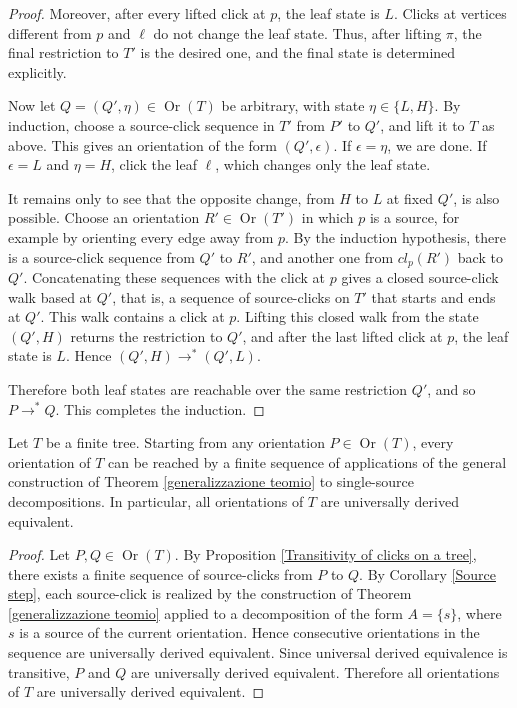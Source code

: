 \begin{proof}
Moreover, after every lifted click at $p$, the leaf state is $L$. Clicks at vertices different from $p$ and $\ell$ do not change the leaf state. Thus, after lifting $\pi$, the final restriction to $T'$ is the desired one, and the final state is determined explicitly.

Now let $Q=(Q',\eta) \in \operatorname{Or}(T)$ be arbitrary, with state $\eta \in \{L,H\}$. By induction, choose a source-click sequence in $T'$ from $P'$ to $Q'$, and lift it to $T$ as above. This gives an orientation of the form $(Q', \epsilon)$. If $\epsilon = \eta$, we are done. If $\epsilon=L$ and $\eta=H$, click the leaf $\ell$, which changes only the leaf state.

It remains only to see that the opposite change, from $H$ to $L$ at fixed $Q'$, is also possible. Choose an orientation $R' \in \operatorname{Or}(T')$ in which $p$ is a source, for example by orienting every edge away from $p$. By the induction hypothesis, there is a source-click sequence from $Q'$ to $R'$, and another one from $cl_p(R')$ back to $Q'$. Concatenating these sequences with the click at $p$ gives a closed source-click walk based at $Q'$, that is, a sequence of source-clicks on $T'$ that starts and ends at $Q'$. This walk contains a click at $p$. Lifting this closed walk from the state $(Q',H)$ returns the restriction to $Q'$, and after the last lifted click at $p$, the leaf state is $L$. Hence $(Q',H) \to^*(Q',L)$. 

Therefore both leaf states are reachable over the same restriction $Q'$, and so $P \to ^*Q$. This completes the induction.
\end{proof}
\begin{theorem} %
\label{tree-exhaustiveness}
    Let $T$ be a finite tree. Starting from any orientation $P \in \operatorname{Or}(T)$, every orientation of $T$ can be reached by a finite sequence of applications of the general construction of Theorem \ref{generalizzazione teomio} to single-source decompositions. In particular, all orientations of $T$ are universally derived equivalent.
\end{theorem}
\begin{proof}
    Let $P,Q \in \operatorname{Or}(T).$ By Proposition \ref{Transitivity of clicks on a tree}, there exists a finite sequence of source-clicks from $P$ to $Q$. By Corollary \ref{Source step}, each source-click is realized by the construction of Theorem \ref{generalizzazione teomio} applied to a decomposition of the form $A=\{s\}$, where $s$ is a source of the current orientation. Hence consecutive orientations in the sequence are universally derived equivalent. Since universal derived equivalence is transitive, $P$ and $Q$ are universally derived equivalent. Therefore all orientations of $T$ are universally derived equivalent.
\end{proof}

